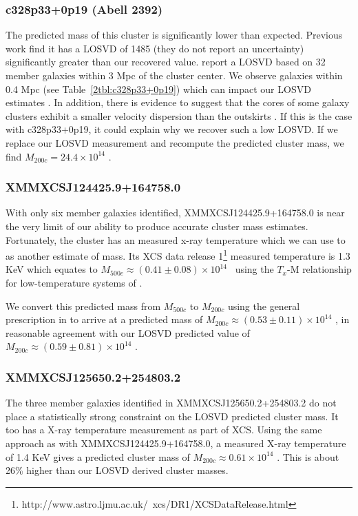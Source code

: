\subsubsection{c328p33+0p19 (Abell 2392)}
The predicted mass of this cluster is significantly lower than expected. Previous work \citep{Wing2013} find it has a LOSVD of 1485 \kms (they do not report an uncertainty) significantly greater than our recovered value. \cite{Wing2013} report a LOSVD based on 32 member galaxies within 3 Mpc of the cluster center. We observe galaxies within 0.4 Mpc (see Table~\ref{2tbl:c328p33+0p19}) which can impact our LOSVD estimates . In addition, there is evidence to suggest that the cores of some galaxy clusters exhibit a smaller velocity dispersion than the outskirts . If this is the case with c328p33+0p19, it could explain why we recover such a low LOSVD. If we replace our LOSVD measurement and recompute the predicted cluster mass, we find $M_{200c} = 24.4\times10^{14}$ \Msol.

\subsubsection{XMMXCSJ124425.9+164758.0}
With only six member galaxies identified, XMMXCSJ124425.9+164758.0 is near the very limit of our ability to produce accurate cluster mass estimates. Fortunately, the cluster has an measured x-ray temperature which we can use to as another estimate of mass. Its XCS data release 1\footnote{http://www.astro.ljmu.ac.uk/~xcs/DR1/XCSDataRelease.html} \citep{Mehrtens2012} measured temperature is 1.3 KeV which equates to $M_{500c}\approx(0.41\pm0.08)\times10^{14}$ \Msol\ using the $T_x$-M relationship for low-temperature systems of \cite{Finoguenov2001}.

We convert this predicted mass from $M_{500c}$ to $M_{200c}$ using the general prescription in \cite{Hu2003} to arrive at a predicted mass of $M_{200c} \approx (0.53\pm0.11)\times10^{14}$ \Msol, in reasonable agreement with our LOSVD predicted value of $M_{200c} \approx (0.59\pm0.81)\times10^{14}$ \Msol.

\subsubsection{XMMXCSJ125650.2+254803.2}
The three member galaxies identified in XMMXCSJ125650.2+254803.2 do not place a statistically strong constraint on the LOSVD predicted cluster mass. It too has a X-ray temperature measurement as part of XCS. Using the same approach as with XMMXCSJ124425.9+164758.0, a measured X-ray temperature of 1.4 KeV gives a predicted cluster mass of $M_{200c} \approx 0.61\times10^{14}$ \Msol. This is about 26\% higher than our LOSVD derived cluster masses. 


